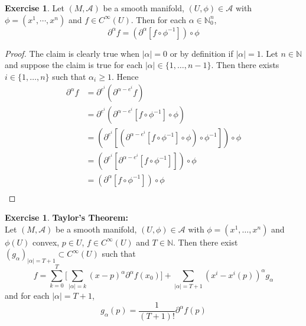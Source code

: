 \documentclass[12pt]{amsart}
\theoremstyle{definition}
\newtheorem{ex}[definition]{Exercise}
\newcommand{\al}{\alpha}
\newcommand{\N}{\mathbb{N}}
\newcommand{\MA}{\mathcal{A}}
\newcommand{\p}{\partial}
\begin{document}
	\begin{ex}
	Let $(M, \MA)$ be a smooth manifold, $(U, \phi) \in \MA$ with $\phi = (x^1, \cdots, x^n)$ and $f \in C^{\infty}(U)$. Then for each $\al \in \N_0^n$, $$\p^{\al} f = (\p^{\al}[ f \circ \phi^{-1}] ) \circ \phi$$
	\end{ex}	
	
	\begin{proof}
	The claim is clearly true when $|\al| =0$ or by definition if $|\al| = 1$. Let $n \in \N$ and suppose the claim is true for each $|\al| \in \{1, \ldots, n-1 \}$. Then there exists $i \in \{1, \ldots, n\}$ such that $\al_i \geq 1$. Hence 
	\begin{align*}
	\p^{\al}f 
	&= \p^{e^i} (\p^{\al - e^i} f) \\
	&= \p^{e^i} (\p^{\al - e^i}[ f \circ \phi^{-1}] \circ \phi) \\
	&= (\p^{e^i} [(\p^{\al - e^i}[ f \circ \phi^{-1}] \circ \phi) \circ \phi^{-1} ]) \circ \phi\\
	&= (\p^{e^i} [\p^{\al - e^i}[ f \circ \phi^{-1}]] )\circ \phi\\
	&= (\p^{\al}[ f \circ \phi^{-1}] )\circ \phi\\
	\end{align*}
	\end{proof}
	
	
	\begin{ex} \textbf{Taylor's Theorem:} \\
	Let $(M, \MA)$ be a smooth manifold, $(U, \phi) \in \MA$ with $\phi = (x^1, \ldots, x^n)$ and $\phi(U)$ convex, $p \in U$, $f \in C^{\infty}(U)$ and $T \in \N$. Then there exist $(g_{\al})_{|\al| = T+1} \subset C^{\infty}(U)$ such that
		$$f = \sum_{k=0}^{T} \bigg[\sum_{|\al| = k}(x - p)^{\al} \p^{\al} f (x_0) \bigg] + \sum_{|\al| = T+1}(x^i - x^i(p))^{\al} g_{\al}$$ and for each $|\al|= T+1$, $$g_{\al}(p) = \frac{1}{(T+1)!}\p^{\al} f(p)$$
	\end{ex}
	
\end{document}
